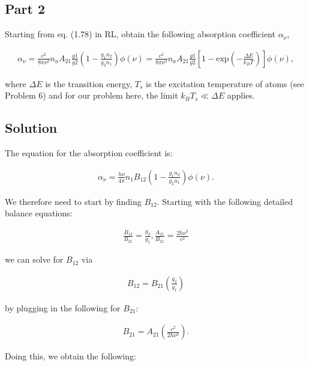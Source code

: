 \documentclass[12pt]{article}
\begin{document}
\subsection*{Part 2}

Starting from eq. (1.78) in RL, obtain the following absorption coefficient $\alpha_\nu$,

\begin{equation*}
\begin{split}
\alpha_\nu = \frac{c^2}{8\pi\nu^2}n_aA_{21}\frac{g1}{g2}\left( 1 - \frac{g_1n_2}{g_2n_1}\right)\phi(\nu) = \frac{c^2}{8\pi\nu^2}n_aA_{21}\frac{g1}{g2}\left[ 1 - \mathrm{exp}\left(-\frac{{\Delta}E}{k_BT}\right)\right]\phi(\nu),
\end{split}
\end{equation*}

where ${\Delta}E$ is the transition energy, $T_s$ is the excitation temperature of atoms (see Problem 6) and for our problem here, the limit $k_BT_s \ll {\Delta}E$ applies.

\subsection*{Solution}

The equation for the absorption coefficient is:

\begin{align*}
\alpha_\nu = \frac{h\nu}{4\pi}n_1B_{12}\left(1 - \frac{g_1n_2}{g_2n_1}\right)\phi(\nu).
\end{align*}

We therefore need to start by finding $B_{12}$. Starting with the following detailed balance equations:

\begin{align*}
\frac{B_{12}}{B_{21}} = \frac{g_2}{g_1}, \frac{A_{21}}{B_{21}} = \frac{2h\nu^3}{c^2}
\end{align*}

we can solve for $B_{12}$ via

\begin{align*}
B_{12} = B_{21}\left(\frac{g_2}{g_1}\right)
\end{align*}

by plugging in the following for $B_{21}$:

\begin{align*}
B_{21} = A_{21}\left(\frac{c^2}{2h\nu^3}\right).
\end{align*}

Doing this, we obtain the following:
\end{document}

